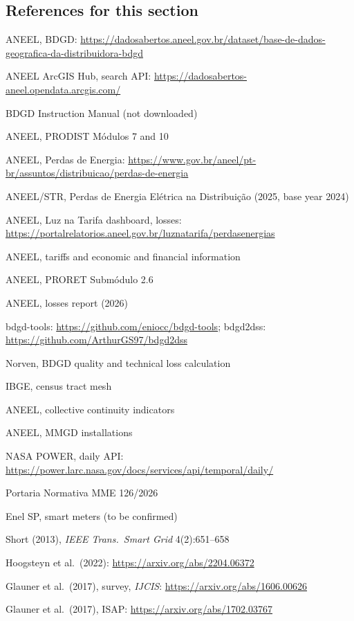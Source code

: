 \subsection*{References for this section}
{\small
\begin{enumerate}[label={[\arabic*]},leftmargin=2.2em,itemsep=1pt]
\item ANEEL, BDGD: \url{https://dadosabertos.aneel.gov.br/dataset/base-de-dados-geografica-da-distribuidora-bdgd}
\item ANEEL ArcGIS Hub, search API: \url{https://dadosabertos-aneel.opendata.arcgis.com/}
\item BDGD Instruction Manual (not downloaded)
\item ANEEL, PRODIST Módulos 7 and 10
\item ANEEL, Perdas de Energia: \url{https://www.gov.br/aneel/pt-br/assuntos/distribuicao/perdas-de-energia}
\item ANEEL/STR, Perdas de Energia Elétrica na Distribuição (2025, base year 2024)
\item ANEEL, Luz na Tarifa dashboard, losses: \url{https://portalrelatorios.aneel.gov.br/luznatarifa/perdasenergias}
\item ANEEL, tariffs and economic and financial information
\item ANEEL, PRORET Submódulo 2.6
\item ANEEL, losses report (2026)
\item bdgd-tools: \url{https://github.com/eniocc/bdgd-tools}; bdgd2dss: \url{https://github.com/ArthurGS97/bdgd2dss}
\item Norven, BDGD quality and technical loss calculation
\item IBGE, census tract mesh
\item ANEEL, collective continuity indicators
\item ANEEL, MMGD installations
\item NASA POWER, daily API: \url{https://power.larc.nasa.gov/docs/services/api/temporal/daily/}
\item Portaria Normativa MME 126/2026
\item Enel SP, smart meters (to be confirmed)
\item Short (2013), \emph{IEEE Trans.\ Smart Grid} 4(2):651--658
\item Hoogsteyn et al.\ (2022): \url{https://arxiv.org/abs/2204.06372}
\item Glauner et al.\ (2017), survey, \emph{IJCIS}: \url{https://arxiv.org/abs/1606.00626}
\item Glauner et al.\ (2017), ISAP: \url{https://arxiv.org/abs/1702.03767}

\end{enumerate}}
